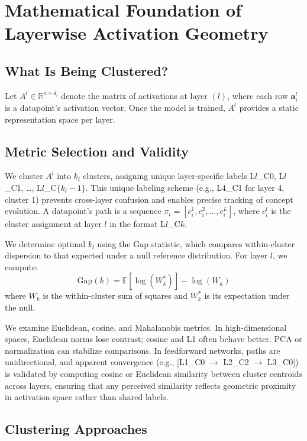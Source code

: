 \section{Mathematical Foundation of Layerwise Activation Geometry}

\subsection{What Is Being Clustered?}

Let $A^l \in \mathbb{R}^{n \times d_l}$ denote the matrix of activations at layer $(l)$, where each row $\mathbf{a}_i^l$ is a datapoint's activation vector. Once the model is trained, $A^l$ provides a static representation space per layer.

\subsection{Metric Selection and Validity}

We cluster $A^l$ into $k_l$ clusters, assigning unique layer-specific labels L$l$\_C0, L$l$\_C1, \dots, L$l$\_C$\{k_l-1\}$. This unique labeling scheme (e.g., L4\_C1 for layer 4, cluster 1) prevents cross-layer confusion and enables precise tracking of concept evolution. A datapoint's path is a sequence $\pi_i = [c_i^1, c_i^2, \dots, c_i^L]$, where $c_i^l$ is the cluster assignment at layer $l$ in the format L$l$\_C$k$. 

We determine optimal $k_l$ using the Gap statistic, which compares within-cluster dispersion to that expected under a null reference distribution. For layer $l$, we compute:
$$\text{Gap}(k) = \mathbb{E}[\log(W_k^*)] - \log(W_k)$$
where $W_k$ is the within-cluster sum of squares and $W_k^*$ is its expectation under the null.

We examine Euclidean, cosine, and Mahalanobis metrics. In high-dimensional spaces, Euclidean norms lose contrast; cosine and L1 often behave better. PCA or normalization can stabilize comparisons. In feedforward networks, paths are unidirectional, and apparent convergence (e.g., [L1\_C0 $\rightarrow$ L2\_C2 $\rightarrow$ L3\_C0]) is validated by computing cosine or Euclidean similarity between cluster centroids across layers, ensuring that any perceived similarity reflects geometric proximity in activation space rather than shared labels.


\subsection{Clustering Approaches}

